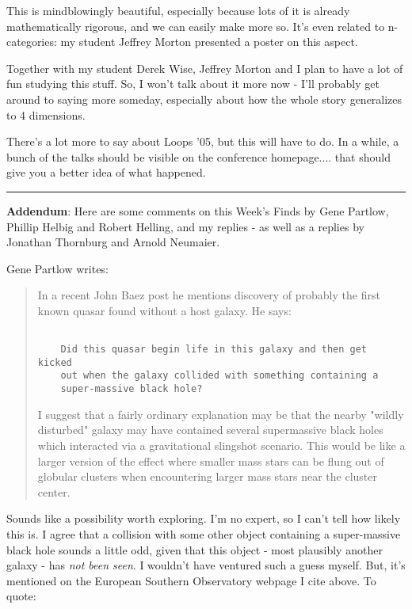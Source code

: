 This is mindblowingly beautiful, especially because lots of it is 
already mathematically rigorous, and we can easily make more so.  
It's even related to n-categories: my student Jeffrey Morton
presented a poster on this aspect.  

Together with my student Derek Wise, Jeffrey Morton and I plan to have 
a lot of fun studying this stuff.  So, I won't talk about it more now - 
I'll probably get around to saying more someday, especially about how 
the whole story generalizes to 4 dimensions.

There's a lot more to say about Loops '05, but this will have to do.
In a while, a bunch of the talks should be visible on the conference 
homepage.... that should give you a better idea of what happened.
 
\par\noindent\rule{\textwidth}{0.4pt}

\textbf{Addendum}: Here are some comments on this Week's Finds by Gene Partlow,
Phillip Helbig and Robert Helling, and my replies - as well as a replies
by Jonathan Thornburg and Arnold Neumaier.

Gene Partlow writes: 

\begin{quote}
 In a recent John Baez post he mentions discovery of probably the 
 first known quasar found without a host galaxy.  He says: 


\begin{verbatim}

    Did this quasar begin life in this galaxy and then get kicked 
    out when the galaxy collided with something containing a 
    super-massive black hole?
\end{verbatim}
    

 I suggest that a fairly ordinary explanation may be that the
 nearby "wildly disturbed" galaxy may have contained several
 supermassive black holes which interacted via a gravitational
 slingshot scenario.  This would be like a larger version of
 the effect where smaller mass stars can be flung out of globular 
 clusters when encountering larger mass stars near the cluster center.
\end{quote}

Sounds like a possibility worth exploring.  I'm no expert, so
I can't tell how likely this is.  I agree that a collision 
with some other object containing a super-massive black hole 
sounds a little odd, given that this object - most plausibly
another galaxy - has \emph{not been seen}.  I wouldn't have ventured
such a guess myself.  But, it's mentioned on the European 
Southern Observatory webpage I cite above.  To quote:

